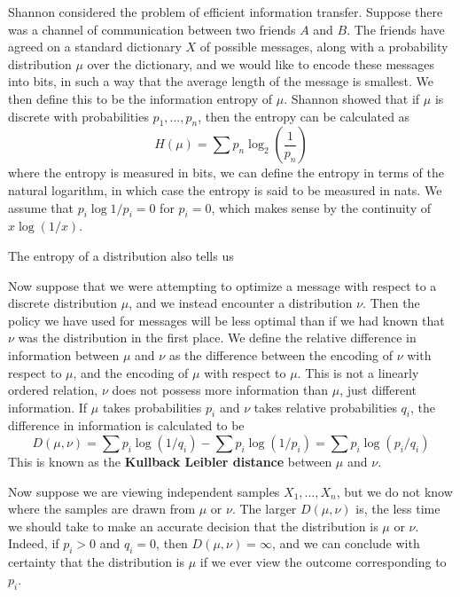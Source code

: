 Shannon considered the problem of efficient information transfer. Suppose there was a channel of communication between two friends $A$ and $B$. The friends have agreed on a standard dictionary $X$ of possible messages, along with a probability distribution $\mu$ over the dictionary, and we would like to encode these messages into bits, in such a way that the average length of the message is smallest. We then define this to be the information entropy of $\mu$. Shannon showed that if $\mu$ is discrete with probabilities $p_1, \dots, p_n$, then the entropy can be calculated as
%
\[ H(\mu) = \sum p_n \log_2 \left( \frac{1}{p_n} \right) \]
%
where the entropy is measured in bits, we can define the entropy in terms of the natural logarithm, in which case the entropy is said to be measured in nats. We assume that $p_i \log 1/p_i = 0$ for $p_i = 0$, which makes sense by the continuity of $x \log (1/x)$.

The entropy of a distribution also tells us 

Now suppose that we were attempting to optimize a message with respect to a discrete distribution $\mu$, and we instead encounter a distribution $\nu$. Then the policy we have used for messages will be less optimal than if we had known that $\nu$ was the distribution in the first place. We define the relative difference in information between $\mu$ and $\nu$ as the difference between the encoding of $\nu$ with respect to $\mu$, and the encoding of $\mu$ with respect to $\mu$. This is not a linearly ordered relation, $\nu$ does not possess more information than $\mu$, just different information. If $\mu$ takes probabilities $p_i$ and $\nu$ takes relative probabilities $q_i$, the difference in information is calculated to be
%
\[ D(\mu, \nu) = \sum p_i \log(1/q_i) - \sum p_i \log(1/p_i) = \sum p_i \log(p_i/q_i) \]
%
This is known as the {\bf Kullback Leibler distance} between $\mu$ and $\nu$.

Now suppose we are viewing independent samples $X_1, \dots, X_n$, but we do not know where the samples are drawn from $\mu$ or $\nu$. The larger $D(\mu, \nu)$ is, the less time we should take to make an accurate decision that the distribution is $\mu$ or $\nu$. Indeed, if $p_i > 0$ and $q_i = 0$, then $D(\mu, \nu) = \infty$, and we can conclude with certainty that the distribution is $\mu$ if we ever view the outcome corresponding to $p_i$.

